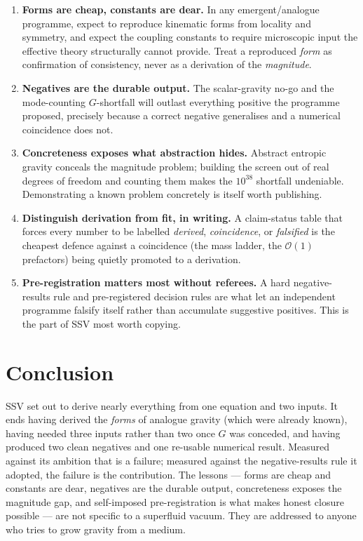 \documentclass[11pt]{article}
\begin{document}
\begin{enumerate}[leftmargin=1.6em]
\item \textbf{Forms are cheap, constants are dear.} In any emergent/analogue
  programme, expect to reproduce kinematic forms from locality and symmetry, and
  expect the coupling constants to require microscopic input the effective theory
  structurally cannot provide. Treat a reproduced \emph{form} as confirmation of
  consistency, never as a derivation of the \emph{magnitude}.
\item \textbf{Negatives are the durable output.} The scalar-gravity no-go and the
  mode-counting $G$-shortfall will outlast everything positive the programme
  proposed, precisely because a correct negative generalises and a numerical
  coincidence does not.
\item \textbf{Concreteness exposes what abstraction hides.} Abstract entropic
  gravity conceals the magnitude problem; building the screen out of real degrees
  of freedom and counting them makes the $10^{38}$ shortfall undeniable.
  Demonstrating a known problem concretely is itself worth publishing.
\item \textbf{Distinguish derivation from fit, in writing.} A claim-status table
  that forces every number to be labelled \emph{derived}, \emph{coincidence}, or
  \emph{falsified} is the cheapest defence against a coincidence (the mass ladder,
  the $\mathcal{O}(1)$ prefactors) being quietly promoted to a derivation.
\item \textbf{Pre-registration matters most without referees.} A hard
  negative-results rule and pre-registered decision rules are what let an
  independent programme falsify itself rather than accumulate suggestive
  positives. This is the part of SSV most worth copying.
\end{enumerate}

\section{Conclusion}

SSV set out to derive nearly everything from one equation and two inputs. It ends
having derived the \emph{forms} of analogue gravity (which were already known),
having needed three inputs rather than two once $G$ was conceded, and having
produced two clean negatives and one re-usable numerical result. Measured against
its ambition that is a failure; measured against the negative-results rule it
adopted, the failure is the contribution. The lessons --- forms are cheap and
constants are dear, negatives are the durable output, concreteness exposes the
magnitude gap, and self-imposed pre-registration is what makes honest closure
possible --- are not specific to a superfluid vacuum. They are addressed to anyone
who tries to grow gravity from a medium.
\end{document}
